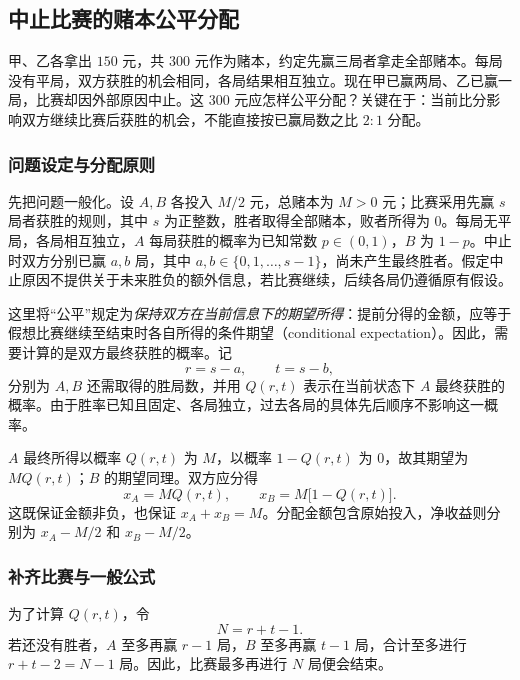 \documentclass[UTF8,12pt,a4paper,fontset=fandol]{ctexbook}
\begin{document}
\subsection{中止比赛的赌本公平分配}
\label{subsec:points-fair-allocation}

甲、乙各拿出 $150$ 元，共 $300$ 元作为赌本，约定先赢三局者拿走全部赌本。每局没有平局，双方获胜的机会相同，各局结果相互独立。现在甲已赢两局、乙已赢一局，比赛却因外部原因中止。这 $300$ 元应怎样公平分配？关键在于：当前比分影响双方继续比赛后获胜的机会，不能直接按已赢局数之比 $2:1$ 分配。

\subsubsection{问题设定与分配原则}
\label{subsubsec:points-problem}

先把问题一般化。设 $A,B$ 各投入 $M/2$ 元，总赌本为 $M>0$ 元；比赛采用先赢 $s$ 局者获胜的规则，其中 $s$ 为正整数，胜者取得全部赌本，败者所得为 $0$。每局无平局，各局相互独立，$A$ 每局获胜的概率为已知常数 $p\in(0,1)$，$B$ 为 $1-p$。中止时双方分别已赢 $a,b$ 局，其中 $a,b\in\{0,1,\ldots,s-1\}$，尚未产生最终胜者。假定中止原因不提供关于未来胜负的额外信息，若比赛继续，后续各局仍遵循原有假设。

这里将“公平”规定为\emph{保持双方在当前信息下的期望所得}：提前分得的金额，应等于假想比赛继续至结束时各自所得的条件期望（conditional expectation）。因此，需要计算的是双方最终获胜的概率。记
\begin{equation}
  r=s-a,\qquad t=s-b,
  \label{eq:points-remaining}
\end{equation}
分别为 $A,B$ 还需取得的胜局数，并用 $Q(r,t)$ 表示在当前状态下 $A$ 最终获胜的概率。由于胜率已知且固定、各局独立，过去各局的具体先后顺序不影响这一概率。

$A$ 最终所得以概率 $Q(r,t)$ 为 $M$，以概率 $1-Q(r,t)$ 为 $0$，故其期望为 $M Q(r,t)$；$B$ 的期望同理。双方应分得
\begin{equation}
  x_A=M Q(r,t),\qquad x_B=M\bigl[1-Q(r,t)\bigr].
  \label{eq:points-allocation}
\end{equation}
这既保证金额非负，也保证 $x_A+x_B=M$。分配金额包含原始投入，净收益则分别为 $x_A-M/2$ 和 $x_B-M/2$。

\subsubsection{补齐比赛与一般公式}
\label{subsubsec:points-binomial}

为了计算 $Q(r,t)$，令
\begin{equation}
  N=r+t-1.
  \label{eq:points-horizon}
\end{equation}
若还没有胜者，$A$ 至多再赢 $r-1$ 局，$B$ 至多再赢 $t-1$ 局，合计至多进行 $r+t-2=N-1$ 局。因此，比赛最多再进行 $N$ 局便会结束。
\end{document}
